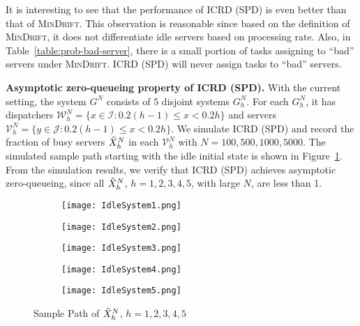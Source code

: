 \documentclass[11pt, reqno]{article}
\numberwithin{equation}{section}
\numberwithin{theorem}{section}
\begin{document}
It is interesting to see that the performance of ICRD (SPD) is even better than that of \textsc{MinDrift}. This observation is reasonable since based on the definition of \textsc{MinDrift}, it does not differentiate idle servers based on processing rate. Also, in Table~\ref{table:prob-bad-server}, there is a small portion of tasks assigning to ``bad'' servers under \textsc{MinDrift}. ICRD (SPD) will never assign tasks to ``bad'' servers. 
\vspace{.2cm}

\noindent
\textbf{Asymptotic zero-queueing property of ICRD (SPD).}
With the current setting, the system $G^N$ consists of $5$ disjoint systems $G^N_h$. For each $G^N_h$, it has dispatchers $\mathcal{W}^N_h=\{x\in\mathcal{I}: 0.2(h-1)\leq x<0.2h\}$ and servers $\mathcal{V}^N_h=\{y\in\mathcal{J}: 0.2(h-1)\leq x<0.2h\}$. We simulate ICRD (SPD) and record the fraction of busy servers $\Tilde{X}^N_{h}$ in each $\mathcal{V}^N_h$ with $N=100,500,1000,5000$. The simulated sample path starting with the idle initial state is shown in Figure~\ref{fig:sample path}. From the simulation results, we verify that ICRD (SPD) achieves asymptotic zero-queueing, since all $\Tilde{X}^N_h$, $h=1,2,3,4,5$, with large $N$, are less than 1.  
\begin{figure}[!htb]
     \centering
     \begin{subfigure}[b]{0.3\textwidth}
         \centering
         \texttt{[image: IdleSystem1.png]}
     \end{subfigure}
     \hfill
     \begin{subfigure}[b]{0.3\textwidth}
         \centering
         \texttt{[image: IdleSystem2.png]}
     \end{subfigure}
     \hfill
     \begin{subfigure}[b]{0.3\textwidth}
         \centering
         \texttt{[image: IdleSystem3.png]}
     \end{subfigure}
     \hfill
     \begin{subfigure}[b]{0.3\textwidth}
         \centering
         \texttt{[image: IdleSystem4.png]}
     \end{subfigure}
     \begin{subfigure}[b]{0.3\textwidth}
         \centering
         \texttt{[image: IdleSystem5.png]}
     \end{subfigure}
     \caption{Sample Path of $\Tilde{X}^N_h$, $h=1,2,3,4,5$}
    \label{fig:sample path}
\end{figure}
\end{document}
